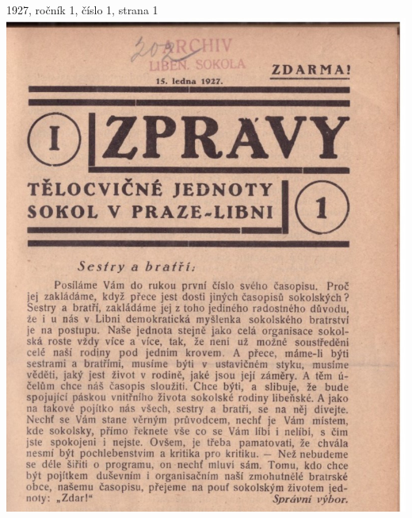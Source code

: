 \documentclass[11pt]{article}
\begin{document}
1927, ročník 1, číslo 1, strana 1\\
\includegraphics[width=\imagewidth]{original/1927/Skener_20250316.jpg}

\vspace{\baselineskip}
\end{document}

